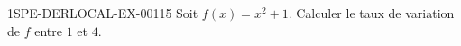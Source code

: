 \begin{exercice}{1SPE-DERLOCAL-EX-001}{1}{5}
Soit $f(x)=x^2+1$. Calculer le taux de variation de $f$ entre $1$ et $4$.
\end{exercice}
